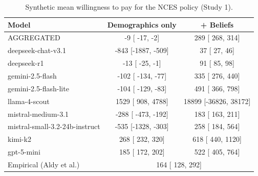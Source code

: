 \begin{table}[h]
\centering
\caption{Synthetic mean willingness to pay for the NCES policy (Study 1).}
\label{tab:syn-wtp-Study1}
\begin{threeparttable}
\footnotesize
\begin{tabular}{lcc}
\toprule
Model & Demographics only & + Beliefs \\
\midrule
AGGREGATED &    -9 [  -17,    -2] &   289 [  268,   314] \\
\midrule
deepseek-chat-v3.1 &  -843 [-1887,  -509] &    37 [   27,    46] \\
deepseek-r1 &   -13 [  -25,    -1] &    91 [   85,    98] \\
gemini-2.5-flash &  -102 [ -134,   -77] &   335 [  276,   440] \\
gemini-2.5-flash-lite &  -104 [ -129,   -83] &   491 [  366,   798] \\
llama-4-scout &  1529 [  908,  4788] & 18899 [-36826, 38172] \\
mistral-medium-3.1 &  -288 [ -473,  -192] &   183 [  163,   211] \\
mistral-small-3.2-24b-instruct &  -535 [-1328,  -303] &   258 [  184,   564] \\
kimi-k2 &   268 [  232,   320] &   618 [  440,  1120] \\
gpt-5-mini &   185 [  172,   202] &   522 [  405,   764] \\
\midrule
Empirical (Aldy et al.) & \multicolumn{2}{c}{  164 [  128,   292]} \\
\bottomrule
\end{tabular}
\end{threeparttable}
\end{table}

